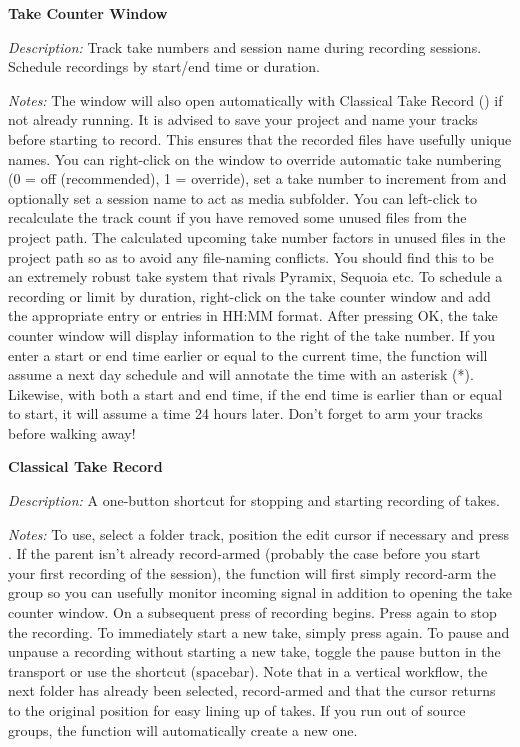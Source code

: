 \documentclass[10pt,american]{article}
\begin{document}
\textbf{Take Counter Window} \keys{\ctrl+\enter}

\emph{Description:} Track take numbers and session name during recording
sessions. Schedule recordings by start/end time or duration.

\emph{Notes:} The window will also open automatically with Classical Take Record
() if not already running. It is advised to save your project and name
your tracks before starting to record. This ensures that the recorded files have
usefully unique names. You can right-click on the window to override automatic
take numbering (0 = off (recommended), 1 = override), set a take number to
increment from and optionally set a session name to act as media subfolder. You
can left-click to recalculate the track count if you have removed some unused
files from the project path. The calculated upcoming take number factors in
unused files in the project path so as to avoid any file-naming conflicts. You
should find this to be an extremely robust take system that rivals Pyramix,
Sequoia etc. To schedule a recording or limit by duration, right-click on the
take counter window and add the appropriate entry or entries in HH:MM format.
After pressing OK, the take counter window will display information to the right
of the take number. If you enter a start or end time earlier or equal to the
current time, the function will assume a next day schedule and will annotate the
time with an asterisk ({*}). Likewise, with both a start and end time, if the
end time is earlier than or equal to start, it will assume a time 24 hours
later. Don't forget to arm your tracks before walking away!

\textbf{Classical Take Record }

\emph{Description:} A one-button shortcut for stopping and starting recording of
takes.

\emph{Notes:} To use, select a folder track, position the edit cursor if
necessary and press  . If the parent isn't already record-armed
(probably the case before you start your first recording of the session), the
function will first simply record-arm the group so you can usefully monitor
incoming signal in addition to opening the take counter window. On a subsequent
press of  recording begins. Press again to stop the recording. To
immediately start a new take, simply press  again. To pause and unpause
a recording without starting a new take, toggle the pause button in the
transport or use the shortcut \keys{\ctrl+\space} (spacebar). Note that in a
vertical workflow, the next folder has already been selected, record-armed and
that the cursor returns to the original position for easy lining up of takes. If
you run out of source groups, the function will automatically create a new one.
\end{document}
